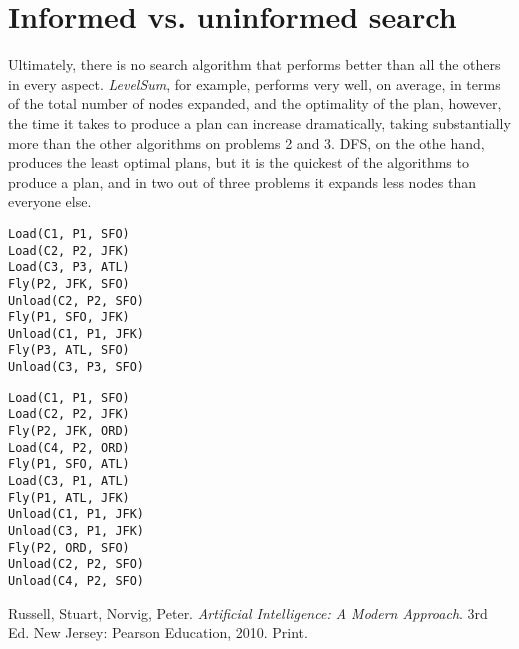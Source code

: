 \documentclass[10pt,a4paper]{article}
\begin{document}
\section*{Informed vs. uninformed search}

Ultimately, there is no search algorithm that performs better than all the
others in every aspect. \textit{LevelSum}, for example, performs very well,
on average, in terms of the total number of nodes expanded, and the optimality
of the plan, however, the time it takes to produce a plan can increase
dramatically, taking substantially more than the other algorithms on problems
2 and 3. DFS, on the othe hand, produces the least optimal plans, but it is the
quickest of the algorithms to produce a plan, and in two out of three problems
it expands less nodes than everyone else.

\begin{mdframed}[frametitle={Problem 2: Optimal Plan},
                 backgroundcolor=light-grey, roundcorner=10pt,
                 leftmargin=1, rightmargin=1,
                 innerleftmargin=15, innerrightmargin=15,
                 innertopmargin=15, innerbottommargin=15,
                 outerlinewidth=1, linecolor=light-grey]
\begin{lstlisting}
Load(C1, P1, SFO)
Load(C2, P2, JFK)
Load(C3, P3, ATL)
Fly(P2, JFK, SFO)
Unload(C2, P2, SFO)
Fly(P1, SFO, JFK)
Unload(C1, P1, JFK)
Fly(P3, ATL, SFO)
Unload(C3, P3, SFO)
\end{lstlisting}
\end{mdframed}


\begin{mdframed}[frametitle={Problem 3: Optimal Plan},
                 backgroundcolor=light-grey, roundcorner=10pt,
                 leftmargin=1, rightmargin=1,
                 innerleftmargin=15, innerrightmargin=15,
                 innertopmargin=15, innerbottommargin=15,
                 outerlinewidth=1, linecolor=light-grey]
\begin{lstlisting}
Load(C1, P1, SFO)
Load(C2, P2, JFK)
Fly(P2, JFK, ORD)
Load(C4, P2, ORD)
Fly(P1, SFO, ATL)
Load(C3, P1, ATL)
Fly(P1, ATL, JFK)
Unload(C1, P1, JFK)
Unload(C3, P1, JFK)
Fly(P2, ORD, SFO)
Unload(C2, P2, SFO)
Unload(C4, P2, SFO)
\end{lstlisting}
\end{mdframed}

\begin{thebibliography}{9}
    Russell, Stuart, Norvig, Peter.
    \emph{Artificial Intelligence: A Modern Approach}.
    3rd Ed. New Jersey: Pearson Education, 2010. Print.
\end{thebibliography}
\end{document}

